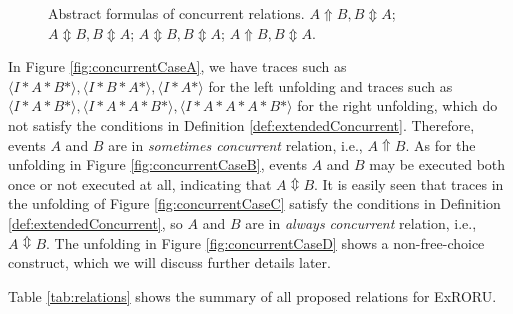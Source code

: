 \documentclass{llncs}
\begin{document}
\begin{figure}[htbp]
{\begin{minipage}[b]{0.3\textwidth}
	\end{minipage}
	\label{fig:concurrentCaseC}
}
\caption{Abstract formulas of concurrent relations.  $A\Uparrow B,B\Updownarrow A$;  $A\Updownarrow B,B\Updownarrow A$;  $A\Updownarrow B,B\Updownarrow A$;  $A\Uparrow B,B\Updownarrow A$.\label{fig:concurrentCases}}
\end{figure}

In Figure \ref{fig:concurrentCaseA}, we have traces such as $\langle I*A*B*\rangle ,\langle I*B*A*\rangle ,\langle I*A*\rangle $ for the left unfolding and traces such as $\langle I*A*B*\rangle ,\langle I*A*A*B*\rangle ,\langle I*A*A*A*B*\rangle$ for the right unfolding, which do not satisfy the conditions in Definition \ref{def:extendedConcurrent}. Therefore, events $A$ and $B$ are in \textit{sometimes concurrent} relation, i.e., $A\Uparrow B$. As for the unfolding in Figure \ref{fig:concurrentCaseB}, events $A$ and $B$ may be executed both once or not executed at all, indicating that $A\Updownarrow B$. It is easily seen that traces in the unfolding of Figure \ref{fig:concurrentCaseC} satisfy the conditions in Definition \ref{def:extendedConcurrent}, so $A$ and $B$ are in \textit{always concurrent} relation, i.e., $A\Updownarrow B$. The unfolding in Figure \ref{fig:concurrentCaseD} shows a non-free-choice construct, which we will discuss further details later.

Table \ref{tab:relations} shows the summary of all proposed relations for ExRORU.
\end{document}
